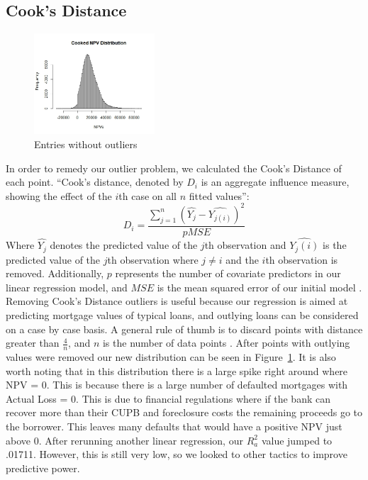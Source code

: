 \documentclass[12 pt]{uncw_thesis}
\theoremstyle{plain}
\theoremstyle{remark}
\theoremstyle{definition}
\begin{document}
\subsection{Cook's Distance}

\begin{figure}
	\vspace{-\baselineskip}
	\centering
	\includegraphics[width=0.4\textwidth]{images/Cooked.jpeg}
	\caption{Entries without outliers}
	\label{fig:Cooks}
\end{figure}
In order to remedy our outlier problem, we calculated the Cook's Distance of each point. ``Cook's distance, denoted by $D_i$ is an aggregate influence measure, showing the effect of the $i$th case on all $n$ fitted values'':
\[D_i = \frac{\sum_{j=1}^n(\hat{Y_j}-\hat{Y_{j(i)}})^2}{pMSE}\]
Where $\hat{Y_j}$ denotes the predicted value of the $j$th observation and $\hat{Y_j(i)}$ is the predicted value of the $j$th observation where $j \neq i$ and the $i$th observation is removed. Additionally, $p$ represents the number of covariate predictors in our linear regression model, and $MSE$ is the mean squared error of our initial model \cite{512}.
Removing Cook's Distance outliers is useful because our regression is aimed at predicting mortgage values of typical loans, and outlying loans can be considered on a case by case basis. A general rule of thumb is to discard points with distance greater than \(\frac{4}{n}\), and \(n\) is the number of data points \cite{Cook's Rule}. After points with outlying values were removed our new distribution can be seen in Figure~\ref{fig:Cooks}. It is also worth noting that in this distribution there is a large spike right around where NPV = 0. This is because there is a large number of  defaulted mortgages with Actual Loss = 0. This is due to financial regulations where if the bank can recover more than their CUPB and foreclosure costs the remaining proceeds go to the borrower. This leaves many defaults that would have a positive NPV just above 0. After rerunning another linear regression, our \(R^2_a\) value jumped to .01711. However, this is still very low, so we looked to other tactics to improve predictive power.
\end{document}
